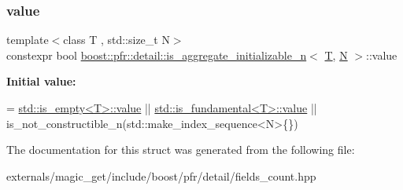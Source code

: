 \subsubsection{\texorpdfstring{value}{value}}
{\footnotesize\ttfamily template$<$class T , std\+::size\+\_\+t N$>$ \\
constexpr bool \mbox{\hyperlink{structboost_1_1pfr_1_1detail_1_1is__aggregate__initializable__n}{boost\+::pfr\+::detail\+::is\+\_\+aggregate\+\_\+initializable\+\_\+n}}$<$ \mbox{\hyperlink{struct_t}{T}}, \mbox{\hyperlink{group__types_gaf9c1edb0e0da55ec6ba09f32f6839529}{N}} $>$\+::value\hspace{0.3cm}{\ttfamily [static]}}

{\bfseries Initial value\+:}
\begin{DoxyCode}
=
           \mbox{\hyperlink{namespacewebsocketpp_1_1close_1_1status_a8614a5c4733d708e2d2a32191c5bef84}{std::is\_empty<T>::value}}
        || \mbox{\hyperlink{namespacewebsocketpp_1_1close_1_1status_a8614a5c4733d708e2d2a32191c5bef84}{std::is\_fundamental<T>::value}}
        || is\_not\_constructible\_n(std::make\_index\_sequence<N>\{\})
\end{DoxyCode}


The documentation for this struct was generated from the following file\+:\begin{DoxyCompactItemize}
\item 
externals/magic\+\_\+get/include/boost/pfr/detail/fields\+\_\+count.\+hpp\end{DoxyCompactItemize}
